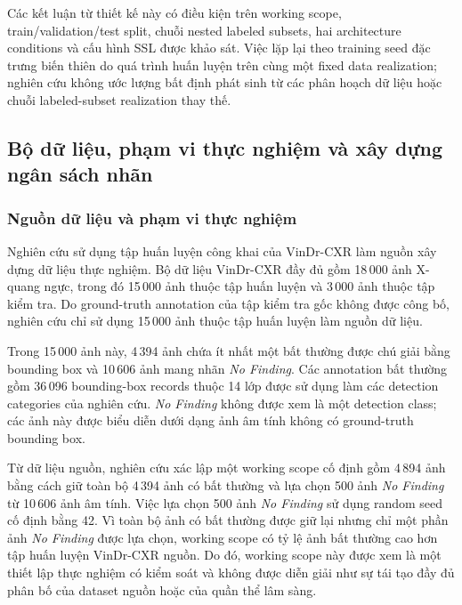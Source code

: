 \documentclass[pdflatex,sn-mathphys-num]{sn-jnl}%
\theoremstyle{thmstyleone}%
\theoremstyle{thmstyletwo}%
\theoremstyle{thmstylethree}%
\begin{document}
Các kết luận từ thiết kế này có điều kiện trên working scope,
train/validation/test split, chuỗi nested labeled subsets, hai architecture
conditions và cấu hình SSL được khảo sát. Việc lặp lại theo training seed
đặc trưng biến thiên do quá trình huấn luyện trên cùng một fixed data
realization; nghiên cứu không ước lượng bất định phát sinh từ các phân hoạch
dữ liệu hoặc chuỗi labeled-subset realization thay thế.



\subsection{Bộ dữ liệu, phạm vi thực nghiệm và xây dựng ngân sách nhãn}
\label{subsec:dataset_scope}

\subsubsection{Nguồn dữ liệu và phạm vi thực nghiệm}
\label{subsubsec:experimental_scope}

Nghiên cứu sử dụng tập huấn luyện công khai của VinDr-CXR
\cite{nguyen2022vindr} làm nguồn xây dựng dữ liệu thực nghiệm. Bộ dữ liệu
VinDr-CXR đầy đủ gồm 18\,000 ảnh X-quang ngực, trong đó 15\,000 ảnh thuộc
tập huấn luyện và 3\,000 ảnh thuộc tập kiểm tra. Do ground-truth annotation
của tập kiểm tra gốc không được công bố, nghiên cứu chỉ sử dụng 15\,000 ảnh
thuộc tập huấn luyện làm nguồn dữ liệu.

Trong 15\,000 ảnh này, 4\,394 ảnh chứa ít nhất một bất thường được chú giải
bằng bounding box và 10\,606 ảnh mang nhãn \textit{No Finding}. Các
annotation bất thường gồm 36\,096 bounding-box records thuộc 14 lớp được
sử dụng làm các detection categories của nghiên cứu. \textit{No Finding}
không được xem là một detection class; các ảnh này được biểu diễn dưới
dạng ảnh âm tính không có ground-truth bounding box.

Từ dữ liệu nguồn, nghiên cứu xác lập một working scope cố định gồm 4\,894
ảnh bằng cách giữ toàn bộ 4\,394 ảnh có bất thường và lựa chọn 500 ảnh
\textit{No Finding} từ 10\,606 ảnh âm tính. Việc lựa chọn 500 ảnh
\textit{No Finding} sử dụng random seed cố định bằng 42. Vì toàn bộ ảnh
có bất thường được giữ lại nhưng chỉ một phần ảnh \textit{No Finding} được
lựa chọn, working scope có tỷ lệ ảnh bất thường cao hơn tập huấn luyện
VinDr-CXR nguồn. Do đó, working scope này được xem là một thiết lập thực
nghiệm có kiểm soát và không được diễn giải như sự tái tạo đầy đủ phân bố
của dataset nguồn hoặc của quần thể lâm sàng.
\end{document}
